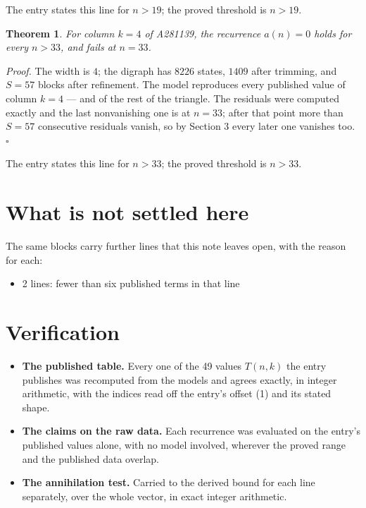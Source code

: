 \documentclass[11pt]{article}
\newtheorem{theorem}{Theorem}
\theoremstyle{definition}
\begin{document}
The entry states this line for $n > 19$; the proved threshold is $n > 19$.

\begin{theorem} For column $k = 4$ of A281139, the recurrence $a(n) = 0$ holds for every $n > 33$, and fails at $n = 33$.\end{theorem}

{\itshape Proof.} The width is $4$; the digraph has $8226$ states, $1409$ after trimming, and $S = 57$ blocks after refinement. The model reproduces every published value of column $k = 4$ --- and of the rest of the triangle. The residuals were computed exactly and the last nonvanishing one is at $n = 33$; after that point more than $S = 57$ consecutive residuals vanish, so by Section 3 every later one vanishes too. $\square$

The entry states this line for $n > 33$; the proved threshold is $n > 33$.

\section{What is not settled here}

The same blocks carry further lines that this note leaves open, with the reason for each:

\begin{itemize}

\item 2 lines: fewer than six published terms in that line

\end{itemize}

\section{Verification}

\begin{itemize}

\item {\bfseries The published table.} Every one of the 49 values $T(n,k)$ the entry publishes was recomputed from the models and agrees exactly, in integer arithmetic, with the indices read off the entry's offset (1) and its stated shape.

\item {\bfseries The claims on the raw data.} Each recurrence was evaluated on the entry's published values alone, with no model involved, wherever the proved range and the published data overlap.

\item {\bfseries The annihilation test.} Carried to the derived bound for each line separately, over the whole vector, in exact integer arithmetic.

\end{itemize}
\end{document}
